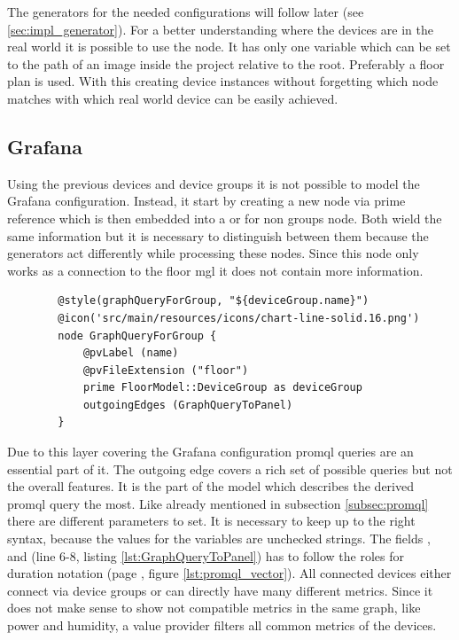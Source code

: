 The generators for the needed configurations will follow later (see \cref{sec:impl_generator}). For a better understanding where the devices are in the real world it is possible to use the  node. It has only one variable which can be set to the path of an image inside the project relative to the root. Preferably a floor plan is used. With this creating device instances without forgetting which node matches with which real world device can be easily achieved.

\subsection{Grafana}

Using the previous devices and device groups it is not possible to model the Grafana configuration. Instead, it start by creating a new node via prime reference which is then embedded into a  or for non groups  node. Both wield the same information but it is necessary to distinguish between them because the generators act differently while processing these nodes. Since this node only works as a connection to the floor \gls{mgl} it does not contain more information. 

\begin{listing}[H]
	\begin{verbatim}
		@style(graphQueryForGroup, "${deviceGroup.name}")
		@icon('src/main/resources/icons/chart-line-solid.16.png')
		node GraphQueryForGroup {
			@pvLabel (name)
			@pvFileExtension ("floor")
			prime FloorModel::DeviceGroup as deviceGroup
			outgoingEdges (GraphQueryToPanel)
		}
	\end{verbatim}
\end{listing}

Due to this layer covering the Grafana configuration \gls{promql} queries are an essential part of it. The outgoing edge  covers a rich set of possible queries but not the overall features. It is the part of the model which describes the derived \gls{promql} query the most. Like already mentioned in subsection \ref{subsec:promql} there are different parameters to set. It is necessary to keep up to the right syntax, because the values for the variables are unchecked strings. The fields ,  and  (line 6-8, listing \ref{lst:GraphQueryToPanel}) has to follow the roles for duration notation (page \pageref{lst:promql_vector}, figure \ref{lst:promql_vector}). All connected devices either connect via device groups or can directly have many different metrics. Since it does not make sense to show not compatible metrics in the same graph, like power and humidity, a value provider filters all common metrics of the devices. 

